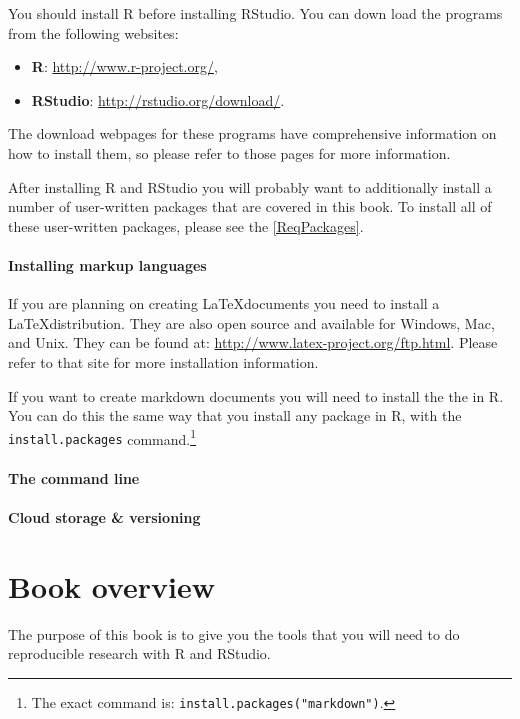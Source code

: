\documentclass[ChapterTOCs,krantz1]{krantz}\usepackage{graphicx, color}
\begin{document}
You should install R before installing RStudio. You can down load the programs from the following websites:

\begin{itemize}
    \item {\bf{R}}: \url{http://www.r-project.org/},
    \item {\bf{RStudio}}: \url{http://rstudio.org/download/}.
\end{itemize}

\noindent The download webpages for these programs have comprehensive information on how to install them, so please refer to those pages for more information.

After installing R and RStudio you will probably want to additionally install a number of user-written packages that are covered in this book. To install all of these user-written packages, please see the \ref{ReqPackages}.

\paragraph{Installing markup languages}

If you are planning on creating \LaTeX documents you need to install a \LaTeX distribution. They are also open source and available for Windows, Mac, and Unix. They can be found at: \url{http://www.latex-project.org/ftp.html}. Please refer to that site for more installation information.

If you want to create markdown documents you will need to install the the  in R. You can do this the same way that you install any package in R, with the {\tt{install.packages}} command.\footnote{The exact command is: {\tt{install.packages("markdown")}}.} 

\paragraph{The command line}

\paragraph{Cloud storage \& versioning}

\section{Book overview}

The purpose of this book is to give you the tools that you will need to do reproducible research with R and RStudio. 
\end{document}
